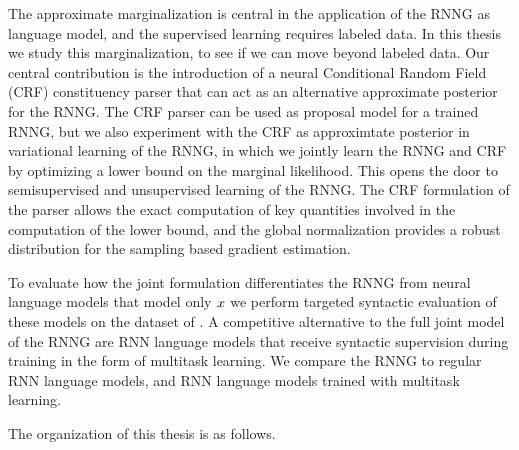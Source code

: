 The approximate marginalization is central in the application of the RNNG as language model, and the supervised learning requires labeled data. In this thesis we study this marginalization, to see if we can move beyond labeled data. Our central contribution is the introduction of a neural Conditional Random Field (CRF) constituency parser that can act as an alternative approximate posterior for the RNNG. The CRF parser can be used as proposal model for a trained RNNG, but we also experiment with the CRF as approximtate posterior in variational learning of the RNNG, in which we jointly learn the RNNG and CRF by optimizing a lower bound on the marginal likelihood. This opens the door to semisupervised and unsupervised learning of the RNNG. The CRF formulation of the parser allows the exact computation of key quantities involved in the computation of the lower bound, and the global normalization provides a robust distribution for the sampling based gradient estimation.

To evaluate how the joint formulation differentiates the RNNG from neural language models that model only $x$ we perform targeted syntactic evaluation of these models on the dataset of \citep{linzen2018targeted}. A competitive alternative to the full joint model of the RNNG are RNN language models that receive syntactic supervision during training in the form of multitask learning. We compare the RNNG to regular RNN language models, and RNN language models trained with multitask learning.

The organization of this thesis is as follows.

